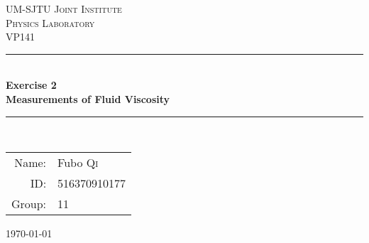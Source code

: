 

\newcommand{\HRule}{\rule{\linewidth}{0.5mm}} %

\begin{center}
    \textsc{\LARGE UM-SJTU Joint Institute}\\[1.5cm] %
    \textsc{\Large Physics Laboratory}\\[0.5cm] %
    \textsc{\large VP141}\\[0.5cm] %

    \HRule \\[0.4cm]
    {\large \bfseries Exercise 2}\\[0.4cm] %
    {\large \bfseries Measurements of Fluid Viscosity }\\[0.4cm]
    \HRule \\[1.5cm]
\end{center} 


\begin{center}
    \hspace*{1cm}
    \begin{minipage}{0.4\textwidth}
    \begin{tabular}{rl}
Name: &  Fubo \textsc{Qi}  \\ID: & 516370910177 \\ Group: & 11 \\
\end{tabular}
\end{minipage}
\vspace{0.5cm}

\end{center}

\begin{center}
    {\large \today}\\[5cm]
\end{center} 

\vfill %
